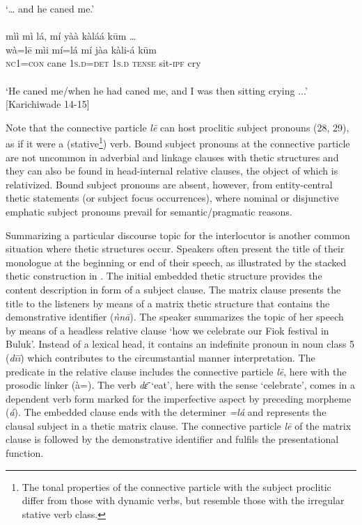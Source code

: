\documentclass[output=paper]{langsci/langscibook}
\begin{document}
\ea\label{ex:schwarz:29}
‘… and he caned me.’\\
 \textup{   } \\
  mìì  {mì   lá}, mí    yàà  kàláá    k\={u}m …\\
  \textup{wà=l\={e}}  mìi  mí=lá \textup{mí}    jàa  kàli-á    k\={u}m\\
     \textsc{nc}1=\textsc{con} cane  1\textsc{s}.\textsc{d}=\textsc{det} 1\textsc{s}.\textsc{d}  \textsc{tense}  sit-\textsc{ipf}    cry\\
     \textup{ } \\       
\glt ‘He caned me/when he had caned me, and I was then sitting crying ...’ [Karichiwade 14-15]
\z

Note that the connective particle \textit{l\={e}} can host proclitic subject pronouns (28, 29), as if it were a (stative\footnote{The tonal properties of the connective particle with the subject proclitic differ from those with dynamic verbs, but resemble those with the irregular stative verb class.}) verb. Bound subject pronouns at the connective particle are not uncommon in adverbial and linkage clauses with thetic structures and they can also be found in head-internal relative clauses, the object of which is relativized. Bound subject pronouns are absent, however, from entity-central thetic statements (or subject focus occurrences), where nominal or disjunctive emphatic subject pronouns prevail for semantic/pragmatic reasons.

Summarizing a particular discourse topic for the interlocutor is another common situation where thetic structures occur. Speakers often present the title of their monologue at the beginning or end of their speech, as illustrated by the stacked thetic construction in . The initial embedded thetic structure provides the content description in form of a subject clause. The matrix clause presents the title to the listeners by means of a matrix thetic structure that contains the demonstrative identifier (\textit{ǹn\={a}}). The speaker summarizes the topic of her speech by means of a headless relative clause ‘how we celebrate our Fiok festival in Buluk’. Instead of a lexical head, it contains an indefinite pronoun in noun class 5 (\textit{d\={i}\={i}}) which contributes to the circumstantial manner interpretation. The predicate in the relative clause includes the connective particle \textit{l\={e}}, here with the prosodic linker (à=). The verb \textit{d\={ɛ}} ‘eat’, here with the sense ‘celebrate’, comes in a dependent verb form marked for the imperfective aspect by preceding morpheme (\textit{á}). The embedded clause ends with the determiner \textit{=lá} and represents the clausal subject in a thetic matrix clause. The connective particle \textit{l\={e}} of the matrix clause is followed by the demonstrative identifier and fulfils the presentational function.
\end{document}
